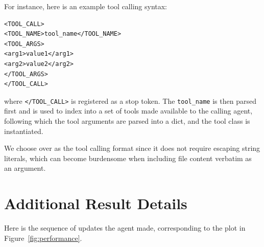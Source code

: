 For instance, here is an example tool calling syntax:
\begin{verbatim}
<TOOL_CALL>
<TOOL_NAME>tool_name</TOOL_NAME>
<TOOL_ARGS>
<arg1>value1</arg1>
<arg2>value2</arg2>
</TOOL_ARGS>
</TOOL_CALL>
\end{verbatim}
where \texttt{</TOOL\_CALL>} is registered as a stop token. The
\texttt{tool\_name} is then parsed first and is used to index into a set of tools
made available to the calling agent, following which the tool arguments are
parsed into a dict, and the tool class is instantiated.

We choose  over  as the tool calling format since it does not
require escaping string literals, which can become burdensome when including
file content verbatim as an argument.

\section{Additional Result Details}%
\label{subsec:result_details}

Here is the sequence of updates the agent made, corresponding to the plot in Figure~\ref{fig:performance}.

